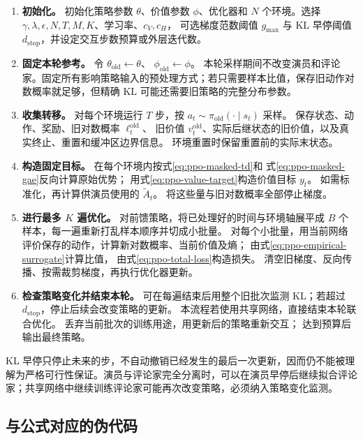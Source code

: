 \documentclass[UTF8]{ctexart}
\begin{document}
\begin{enumerate}
  \item \textbf{初始化。}
  初始化策略参数 $\theta$、价值参数 $\phi$、优化器和 $N$ 个环境。选择
  $\gamma,\lambda,\epsilon,N,T,M,K$、学习率、$c_V,c_H$，
  可选梯度范数阈值 $g_{\max}$ 与 KL 早停阈值
  $d_{\mathrm{stop}}$，并设定交互步数预算或外层迭代数。

  \item \textbf{固定本轮参考。}
  令 $\theta_{\mathrm{old}}\leftarrow\theta$、
  $\phi_{\mathrm{old}}\leftarrow\phi$。
  本轮采样期间不改变演员和评论家。固定所有影响策略输入的预处理方式；若只需要样本比值，保存旧动作对数概率就足够，但精确 KL 可能还需要旧策略的完整分布参数。

  \item \textbf{收集转移。}
  对每个环境运行 $T$ 步，按
  $a_t\sim\pi_{\mathrm{old}}(\cdot\mid s_t)$ 采样。
  保存状态、动作、奖励、旧对数概率 $\ell_t^{\mathrm{old}}$、
  旧价值 $v_t^{\mathrm{old}}$、实际后继状态的旧价值，以及真实终止、重置和缓冲区边界信息。
  环境重置时保留重置前的实际末状态。

  \item \textbf{构造固定目标。}
  在每个环境内按式\eqref{eq:ppo-masked-td}和
  式\eqref{eq:ppo-masked-gae}反向计算原始优势；
  用式\eqref{eq:ppo-value-target}构造价值目标 $y_t$。
  如需标准化，再计算供演员使用的 $\widetilde A_t$。
  将这些量与旧对数概率全部停止梯度。

  \item \textbf{进行最多 $K$ 遍优化。}
  对前馈策略，将已处理好的时间与环境轴展平成 $B$ 个样本，每一遍重新打乱样本顺序并切成小批量。
  对每个小批量，用当前网络评价保存的动作，计算新对数概率、当前价值及熵；
  由式\eqref{eq:ppo-empirical-surrogate}计算比值，
  由式\eqref{eq:ppo-total-loss}构造损失。
  清空旧梯度、反向传播、按需裁剪梯度，再执行优化器更新。

  \item \textbf{检查策略变化并结束本轮。}
  可在每遍结束后用整个旧批次监测 KL；若超过
  $d_{\mathrm{stop}}$，停止后续会改变策略的更新。
  本流程若使用共享网络，直接结束本轮联合优化。
  丢弃当前批次的训练用途，用更新后的策略重新交互；
  达到预算后输出最终策略。
\end{enumerate}

KL 早停只停止未来的步，不自动撤销已经发生的最后一次更新，因而仍不能被理解为严格可行性保证。演员与评论家完全分离时，可以在演员早停后继续拟合评论家；共享网络中继续训练评论家可能再次改变策略，必须纳入策略变化监测。

\subsection{与公式对应的伪代码}
\end{document}

